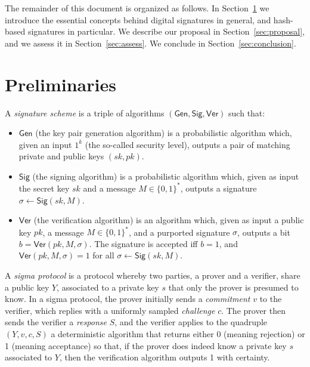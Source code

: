 \documentclass[11pt]{llncs}
\begin{document}
The remainder of this document is organized as follows.
In Section~\ref{sec:prelim} we introduce the essential concepts behind digital signatures in general, and hash-based signatures in particular.
We describe our proposal in Section~\ref{sec:proposal}, and we assess it in Section~\ref{sec:assess}.
We conclude in Section~\ref{sec:conclusion}.

\section{Preliminaries}\label{sec:prelim}

A \emph{signature scheme} is a triple of algorithms $(\textsf{Gen}, \textsf{Sig}, \textsf{Ver})$ such that:
\begin{itemize}
\item $\textsf{Gen}$ (the key pair generation algorithm) is a probabilistic algorithm which, given an input $1^k$ (the so-called security level), outputs a pair of matching private and public keys $(sk, pk)$.
\item $\textsf{Sig}$ (the signing algorithm) is a probabilistic algorithm which, given as input the secret key $sk$ and a message $M \in \{0,1\}^*$, outputs a signature $\sigma \gets \textsf{Sig}(sk, M)$.
\item $\textsf{Ver}$ (the verification algorithm) is an algorithm which, given as input a public key $pk$, a message $M \in \{0,1\}^*$, and a purported signature $\sigma$, outputs a bit $b = \textsf{Ver}(pk, M, \sigma)$. The signature is accepted iff $b = 1$, and $\textsf{Ver}(pk, M, \sigma) = 1$ for all $\sigma \gets \textsf{Sig}(sk, M)$.
\end{itemize}


A \emph{sigma protocol} is a protocol whereby two parties, a prover and a verifier, share a public key $Y$, associated to a private key $s$ that only the prover is presumed to know. In a sigma protocol, the prover initially sends a \emph{commitment} $v$ to the verifier, which replies with a uniformly sampled \emph{challenge} $c$. The prover then sends the verifier a \emph{response} $S$, and the verifier applies to the quadruple $(Y, v, c, S)$ a deterministic algorithm that returns either 0 (meaning rejection) or 1 (meaning acceptance) so that, if the prover does indeed know a private key $s$ associated to $Y$, then the verification algorithm outputs 1 with certainty.
\end{document}
